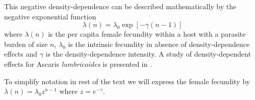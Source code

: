 \documentclass[12pt,a4paper]{article}
\theoremstyle{plain}%
\theoremstyle{definition}
\theoremstyle{remark}
\begin{document}
	This negative density-dependence can be described mathematically by the negative exponential function
	\begin{equation}
	\lambda(n)=\lambda_0 \exp[-\gamma(n-1)]
	\end{equation} 
	where $\lambda(n)$ is the per capita female fecundity within a host with a parasite burden of size $n$,
	$\lambda_0$ is the intrinsic fecundity in absence of density-dependence effects and 
	$\gamma$ is the density-dependence intensity. 
	A study {\color{black} of density-dependent effects } for Ascaris \textit{lumbricoides} is presented in \citep{hall2000geographical}.
	
	To simplify notation in rest of the text we will express the female fecundity by $\lambda(n)=\lambda_0 z^{n-1}$ where $z=e^{-\gamma}$.
	
	
	
\end{document}

